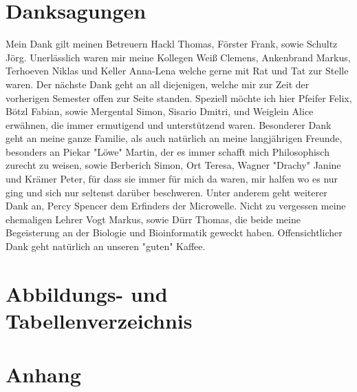 \documentclass{scrartcl}
\begin{document}
\section{Danksagungen}
\label{sec-11}

Mein Dank gilt meinen Betreuern Hackl Thomas, Förster Frank, sowie Schultz Jörg. \newline
Unerlässlich waren mir meine Kollegen Weiß Clemens, Ankenbrand Markus, Terhoeven \newline
Niklas und Keller Anna-Lena  welche gerne mit Rat und Tat zur Stelle waren. \newline
Der nächste Dank geht an all diejenigen, welche mir zur Zeit der vorherigen Semester \newline
offen zur Seite standen. Speziell möchte ich hier Pfeifer Felix, Bötzl Fabian, sowie \newline
Mergental Simon, Sisario Dmitri, und Weiglein Alice erwähnen, die immer ermutigend \newline
und unterstützend waren. Besonderer Dank geht an meine ganze Familie, als auch \newline
natürlich an meine langjährigen Freunde, besonders an Piekar "Löwe" Martin, \newline
der es immer schafft mich Philosophisch zurecht zu weisen, sowie Berberich Simon, \newline
Ort Teresa, Wagner "Drachy" Janine und Krämer Peter, für dass sie immer für \newline
mich da waren, mir halfen wo es nur ging und sich nur seltenst darüber beschweren. \newline
Unter anderem geht weiterer Dank an, Percy Spencer dem Erfinders der Microwelle. \newline
Nicht zu vergessen meine ehemaligen Lehrer Vogt Markus, sowie Dürr Thomas, \newline 
die beide meine Begeisterung an der Biologie und Bioinformatik geweckt haben. \newline
Offensichtlicher Dank geht natürlich an unseren "guten" Kaffee.  \newline


\clearpage
\section{Abbildungs- und Tabellenverzeichnis}
\label{sec-12}
\listoffigures

\listoftables

\clearpage

\section{Anhang}
\label{sec-13}
\end{document}
